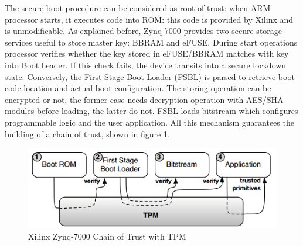 \documentclass[../tesi.tex]{subfiles}
\begin{document}
The secure boot procedure can be considered as root-of-trust: when ARM processor starts, it executes code into ROM: this code is provided by Xilinx and is unmodificable. As explained before, Zynq 7000 provides two secure storage services useful to store master key: BBRAM and eFUSE. During start operations processor verifies whether the key stored in eFUSE/BBRAM matches with key into Boot header. If this check fails, the device transits into a secure lockdown state. 
Conversely, the First Stage Boot Loader (FSBL) is parsed to retrieve boot-code location and actual boot configuration. The storing operation can be encrypted or not, the former case needs decryption operation with AES/SHA modules before loading, the latter do not.
FSBL loads bitstream which configures programmable logic and the user application. All this mechanism guarantees the building of a chain of trust, shown in figure \ref{fig:zynqchainoftrust}. 
\begin{figure}
\centering
\includegraphics[scale=0.40]{images/zynqchainoftrust.png}
\caption{Xilinx Zynq-7000 Chain of Trust with TPM}
\label{fig:zynqchainoftrust}
\end{figure}
\end{document}
